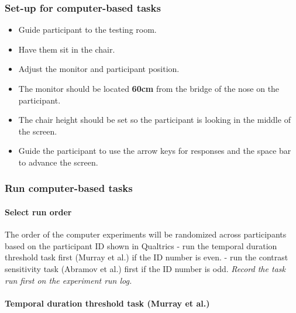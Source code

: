 \documentclass[]{article}
\providecommand{\tightlist}{%
  \setlength{\itemsep}{0pt}\setlength{\parskip}{0pt}}
\let\oldparagraph\paragraph
\renewcommand{\paragraph}[1]{\oldparagraph{#1}\mbox{}}
\begin{document}
\subsubsection{Set-up for computer-based
tasks}\label{set-up-for-computer-based-tasks-1}

\begin{itemize}
\tightlist
\item
  Guide participant to the testing room.
\item
  Have them sit in the chair.
\item
  Adjust the monitor and participant position.
\item
  The monitor should be located \textbf{60cm} from the bridge of the
  nose on the participant.
\item
  The chair height should be set so the participant is looking in the
  middle of the screen.
\item
  Guide the participant to use the arrow keys for responses and the
  space bar to advance the screen.
\end{itemize}

\subsubsection{Run computer-based tasks}\label{run-computer-based-tasks}

\paragraph{Select run order}\label{select-run-order}

The order of the computer experiments will be randomized across
participants based on the participant ID shown in Qualtrics - run the
temporal duration threshold task first (Murray et al.) if the ID number
is even. - run the contrast sensitivity task (Abramov et al.) first if
the ID number is odd. \emph{Record the task run first on the experiment
run log.}

\paragraph{Temporal duration threshold task (Murray et
al.)}\label{temporal-duration-threshold-task-murray-et-al.}
\end{document}
